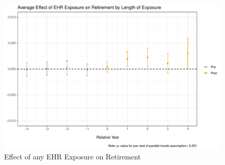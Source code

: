 \documentclass[11pt]{article}
\begin{document}
\begin{figure}[ht]
\caption{Effect of any EHR Exposure on Retirement}
\vspace{2mm}
\centering
\hspace{20mm}
\includegraphics[scale=.45]{Objects/CS_retire_allEHR.pdf}
\vspace{3mm}
\newline
        \hspace{0.1cm}
\end{figure}
\end{document}
